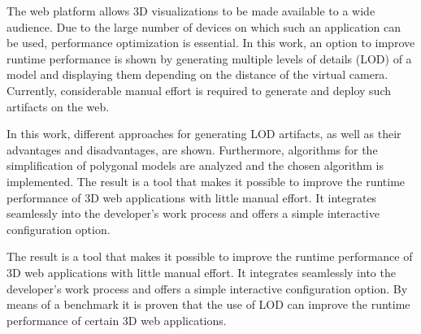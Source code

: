 The web platform allows 3D visualizations to be made available to a wide audience. Due to the large number of devices on which such an application can be used, performance optimization is essential. In this work, an option to improve runtime performance is shown by generating multiple levels of details (LOD) of a model and displaying them depending on the distance of the virtual camera. Currently, considerable manual effort is required to generate and deploy such artifacts on the web.

\bigbreak
In this work, different approaches for generating LOD artifacts, as well as their advantages and disadvantages, are shown.
Furthermore, algorithms for the simplification of polygonal models are analyzed and the chosen algorithm is implemented.
The result is a tool that makes it possible to improve the runtime performance of 3D web applications with little manual effort.
It integrates seamlessly into the developer's work process and offers a simple interactive configuration option.

\bigbreak
The result is a tool that makes it possible to improve the runtime performance of 3D web applications with little manual effort.
It integrates seamlessly into the developer's work process and offers a simple interactive configuration option.
By means of a benchmark it is proven that the use of LOD can improve the runtime performance of certain 3D web applications.
